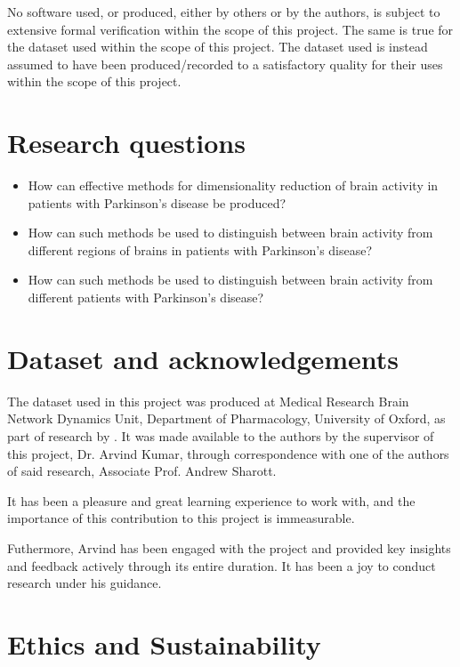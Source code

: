 \documentclass{kththesis}
\begin{document}
No software used, or produced, either by others or by the authors, is subject to extensive formal verification within the scope of this project. 
The same is true for the dataset used within the scope of this project.
The dataset used is instead assumed to have been produced/recorded to a satisfactory quality for their uses within the scope of this project.

\section{Research questions}

\begin{itemize}
    \item How can effective methods for dimensionality reduction of brain activity in patients with Parkinson's disease be produced?
    \item How can such methods be used to distinguish between brain activity from different regions of brains in patients with Parkinson's disease?
    \item How can such methods be used to distinguish between brain activity from different patients with Parkinson's disease?
\end{itemize}

\section{Dataset and acknowledgements}

The dataset used in this project was produced at Medical Research Brain Network Dynamics Unit, Department of Pharmacology, University of Oxford, as part of research by \textcite{Cagnan}.
It was made available to the authors by the supervisor of this project, Dr. Arvind Kumar, through correspondence with one of the authors of said research, Associate Prof. Andrew Sharott.

It has been a pleasure and great learning experience to work with, and the importance of this contribution to this project is immeasurable.

Futhermore, Arvind has been engaged with the project and provided key insights and feedback actively through its entire duration.
It has been a joy to conduct research under his guidance.

\section{Ethics and Sustainability}
\end{document}
